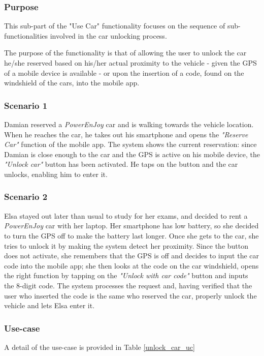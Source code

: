 \subsubsection{Purpose}
This sub-part of the "Use Car" functionality focuses on the sequence of sub-functionalities involved in the car unlocking process.

The purpose of the functionality is that of allowing the user to unlock the car he/she reserved based on his/her actual proximity to the vehicle - given the GPS of a mobile device is available - or upon the insertion of a code, found on the windshield of the cars, into the mobile app.

\subsubsection{Scenario 1}
Damian reserved a \emph{PowerEnJoy} car and is walking towards the vehicle location. When he reaches the car, he takes out his smartphone and opens the \emph{"Reserve Car"} function of the mobile app. The system shows the current reservation: since Damian is close enough to the car and the GPS is active on his mobile device, the \emph{"Unlock car"} button has been activated. He taps on the button and the car unlocks, enabling him to enter it.

\subsubsection{Scenario 2}
Elsa stayed out later than usual to study for her exams, and decided to rent a \emph{PowerEnJoy} car with her laptop. Her smartphone has low battery, so she decided to turn the GPS off to make the battery last longer. Once she gets to the car, she tries to unlock it by making the system detect her proximity. Since the button does not activate, she remembers that the GPS is off and decides to input the car code into the mobile app; she then looks at the code on the car windshield, opens the right function by tapping on the \emph{"Unlock with car code"} button and inputs the 8-digit code. The system processes the request and, having verified that the user who inserted the code is the same who reserved the car, properly unlock the vehicle and lets Elsa enter it.

\subsubsection{Use-case}
A detail of the use-case is provided in Table \ref{unlock_car_uc}

